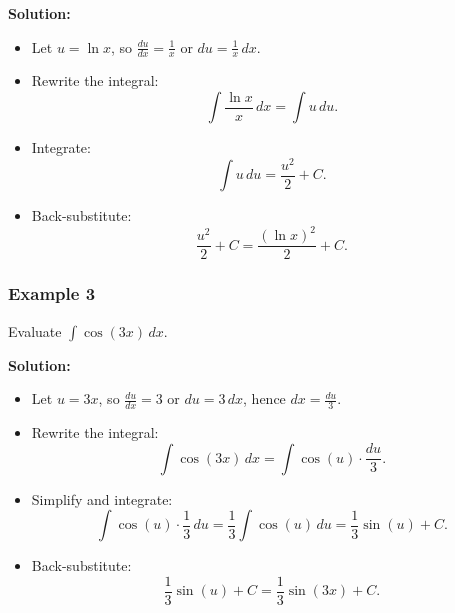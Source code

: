 \documentclass{article}
\begin{document}
\begin{multicols}{2}
\textbf{Solution:}
\begin{itemize}
    \item Let \( u = \ln x \), so \( \frac{du}{dx} = \frac{1}{x} \) or \( du = \frac{1}{x} \, dx \).
    \item Rewrite the integral: \[ \int \frac{\ln x}{x} \, dx = \int u \, du. \]
    \item Integrate: \[ \int u \, du = \frac{u^2}{2} + C. \]
    \item Back-substitute: \[ \frac{u^2}{2} + C = \frac{(\ln x)^2}{2} + C. \]
\end{itemize}

\subsubsection*{Example 3}
Evaluate \( \int \cos(3x) \, dx \).

\textbf{Solution:}
\begin{itemize}
    \item Let \( u = 3x \), so \( \frac{du}{dx} = 3 \) or \( du = 3 \, dx \), hence \( dx = \frac{du}{3} \).
    \item Rewrite the integral: \[ \int \cos(3x) \, dx = \int \cos(u) \cdot \frac{du}{3}. \]
    \item Simplify and integrate: \[ \int \cos(u) \cdot \frac{1}{3} \, du = \frac{1}{3} \int \cos(u) \, du = \frac{1}{3} \sin(u) + C. \]
    \item Back-substitute: \[ \frac{1}{3} \sin(u) + C = \frac{1}{3} \sin(3x) + C. \]
\end{itemize}
\end{multicols}
\end{document}
